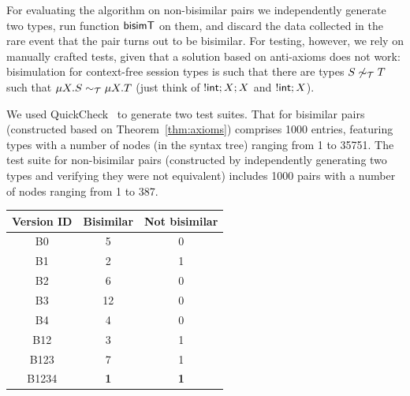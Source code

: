 For evaluating the algorithm on non-bisimilar pairs we independently
generate two types, run function $\mathsf{bisimT}$ on them, and discard the
data collected in the rare event that the pair turns out to be
bisimilar.
%
For testing, however, we rely on manually crafted tests, given that a
solution based on anti-axioms does not work: bisimulation for
context-free session types is such that there are types
$S \not\sim_\mathcal T T$ such that $\mu X.S \sim_\mathcal T \mu X.T$ (just think of
$!\mathsf{int};X;X$ and $!\mathsf{int};X$).

We used QuickCheck~\cite{DBLP:conf/icfp/ClaessenH00} to generate two test
suites. That for bisimilar pairs (constructed based on
Theorem~\ref{thm:axioms}) comprises 1000 entries, featuring types with
a number of nodes (in the syntax tree) ranging from 1 to 35751. The
test suite for non-bisimilar pairs (constructed by independently
generating two types and verifying they were not equivalent) includes
1000 pairs with a number of nodes ranging from 1 to 387.\\
%
%
  \begin{minipage}[b]{0.49\textwidth}
   {\small 
  \centering
 
	\begin{tabular}{ |c|c|c| }
	 \hline
 		Version ID &  {\color{MidnightBlue}Bisimilar} & {\color{orange}Not bisimilar}  \\ 
 		 \hline
	 	B0 & 5 & 0 \\  
	 	B1 &  2 & 1 \\ 
	 	B2 & 6 & 0 \\ 
	 	B3 &  12 & 0 \\
	 	B4 &  4 & 0 \\
	 	B12 &  3 & 1 \\   
	 	B123 &  7 & 1 \\
	 	B1234 &  \bf{1} & \bf{1} \\ 
	 	 \hline  
	\end{tabular}\vspace*{6mm}
	}
	\end{minipage}
	\hfill
